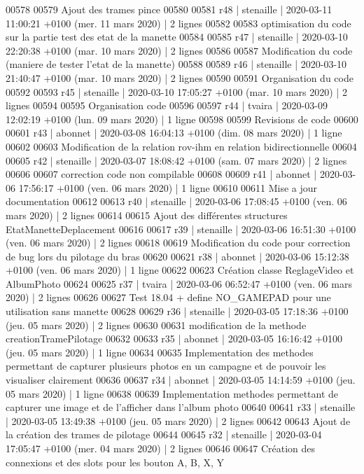 \begin{DoxyCode}
00578 
00579 Ajout des trames pince
00580 
00581 r48 | stenaille | 2020-03-11 11:00:21 +0100 (mer. 11 mars 2020) | 2 lignes
00582 
00583 optimisation du code sur la partie test des etat de la manette
00584 
00585 r47 | stenaille | 2020-03-10 22:20:38 +0100 (mar. 10 mars 2020) | 2 lignes
00586 
00587 Modification du code (maniere de tester l'etat de la manette)
00588 
00589 r46 | stenaille | 2020-03-10 21:40:47 +0100 (mar. 10 mars 2020) | 2 lignes
00590 
00591 Organisation du code
00592 
00593 r45 | stenaille | 2020-03-10 17:05:27 +0100 (mar. 10 mars 2020) | 2 lignes
00594 
00595 Organisation code
00596 
00597 r44 | tvaira | 2020-03-09 12:02:19 +0100 (lun. 09 mars 2020) | 1 ligne
00598 
00599 Revisions de code
00600 
00601 r43 | abonnet | 2020-03-08 16:04:13 +0100 (dim. 08 mars 2020) | 1 ligne
00602 
00603 Modification de la relation rov-ihm en relation bidirectionnelle
00604 
00605 r42 | stenaille | 2020-03-07 18:08:42 +0100 (sam. 07 mars 2020) | 2 lignes
00606 
00607 correction code non compilable
00608 
00609 r41 | abonnet | 2020-03-06 17:56:17 +0100 (ven. 06 mars 2020) | 1 ligne
00610 
00611 Mise a jour documentation
00612 
00613 r40 | stenaille | 2020-03-06 17:08:45 +0100 (ven. 06 mars 2020) | 2 lignes
00614 
00615 Ajout des différentes structures EtatManetteDeplacement
00616 
00617 r39 | stenaille | 2020-03-06 16:51:30 +0100 (ven. 06 mars 2020) | 2 lignes
00618 
00619 Modification du code pour correction de bug lors du pilotage du bras
00620 
00621 r38 | abonnet | 2020-03-06 15:12:38 +0100 (ven. 06 mars 2020) | 1 ligne
00622 
00623 Création classe ReglageVideo et AlbumPhoto
00624 
00625 r37 | tvaira | 2020-03-06 06:52:47 +0100 (ven. 06 mars 2020) | 2 lignes
00626 
00627 Test 18.04 + define NO\_GAMEPAD pour une utilisation sans manette
00628 
00629 r36 | stenaille | 2020-03-05 17:18:36 +0100 (jeu. 05 mars 2020) | 2 lignes
00630 
00631 modification de la methode creationTramePilotage
00632 
00633 r35 | abonnet | 2020-03-05 16:16:42 +0100 (jeu. 05 mars 2020) | 1 ligne
00634 
00635 Implementation des methodes permettant de capturer plusieurs photos en un campagne et de pouvoir les
       visualiser clairement
00636 
00637 r34 | abonnet | 2020-03-05 14:14:59 +0100 (jeu. 05 mars 2020) | 1 ligne
00638 
00639 Implementation methodes permettant de capturer une image et de l'afficher dans l'album photo
00640 
00641 r33 | stenaille | 2020-03-05 13:49:38 +0100 (jeu. 05 mars 2020) | 2 lignes
00642 
00643 Ajout de la création des trames de pilotage
00644 
00645 r32 | stenaille | 2020-03-04 17:05:47 +0100 (mer. 04 mars 2020) | 2 lignes
00646 
00647 Création des connexions et des slots pour les bouton A, B, X, Y

\end{DoxyCode}
